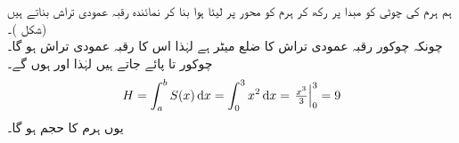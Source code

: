 \quad
{}\quad
ہم ہرم  کی چوٹی کو مبدا پر رکھ کر ہرم  کو محور  پر لیٹا ہوا بنا کر نمائندہ رقبہ عمودی تراش بناتے ہیں (شکل )۔\\
\quad
{}
\quad
چونکہ چوکور رقبہ عمودی تراش کا ضلع  میٹر ہے لہٰذا اس کا رقبہ عمودی تراش  ہو گا۔\\
\quad
{}\quad
چوکور  تا  پائے جاتے ہیں لہٰذا  اور  ہوں گے۔\\
\quad {}
\begin{align*}
H=\int_a^bS(x)\dif x=\int_0^3x^2\dif x=\left.\tfrac{x^3}{3}\right\vert_0^3=9
\end{align*}
یوں ہرم  کا حجم  ہو گا۔
